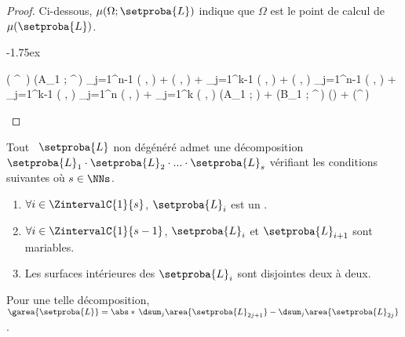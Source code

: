 \begin{proof}
	Ci-dessous, $\mu(\Omega ; \setproba{L})$ indique que $\Omega$ est le point de calcul de $\mu(\setproba{L})$.

    \smallskip
    
    \noindent\kern-1.75ex
    \begin{stepcalc}[style=ar*]
    	\mu(  \cdot {}^{\,\prime} )
	\explnext{}
    	\mu(A_1 ;  \cdot {}^{\,\prime})
	\explnext{}
    	\dsum_{j=1}^{n-1}
			\det \big(  ,  \big)
    	+
	    	\det \big(  ,  \big)
    	+
	    \dsum_{j=1}^{k-1}
			\det \big(  ,  \big)
    	+
	    	\det \big(  ,  \big)
	\explnext{}
    	\dsum_{j=1}^{n-1}
			\det \big(  ,  \big)
    	+
	    \dsum_{j=1}^{k-1}
			\det \big(  ,  \big)
    	\dsum_{j=1}^{n}
			\det \big(  ,  \big)
    	+
	    \dsum_{j=1}^{k}
			\det \big(  ,  \big)
	\explnext{}
    	\mu(A_1 ; ) + \mu(B_1 ; ^{\,\prime})
	\explnext{}
    	\mu() + \mu(^{\,\prime})
    \end{stepcalc}

    \null\vspace{-3.5ex}
\end{proof}




\newpage

\begin{fact} \label{ngone-trick}
    Tout \ncycle\ $\setproba{L}$ non dégénéré admet une décomposition
    $\setproba{L}_1 \cdot \setproba{L}_2 \cdot ... \cdot \setproba{L}_s$ 
    vérifiant les conditions suivantes où $s \in \NNs$.
    \begin{enumerate}
    	\item $\forall i \in \ZintervalC{1}{s}$, $\setproba{L}_i$ est un .
	
    	\item $\forall i \in \ZintervalC{1}{s-1}$, $\setproba{L}_i$ et $\setproba{L}_{i+1}$ sont mariables.

    	\item Les surfaces intérieures des  $\setproba{L}_i$ sont disjointes deux à deux.
    \end{enumerate}
    
    Pour une telle décomposition, 
    $ \garea{\setproba{L}} 
    = \abs*{\,
    	  \dsum_{j} \area{\setproba{L}_{2j + 1}}  
		- \dsum_{j} \area{\setproba{L}_{2j}}
	  \,}$.
\end{fact}


